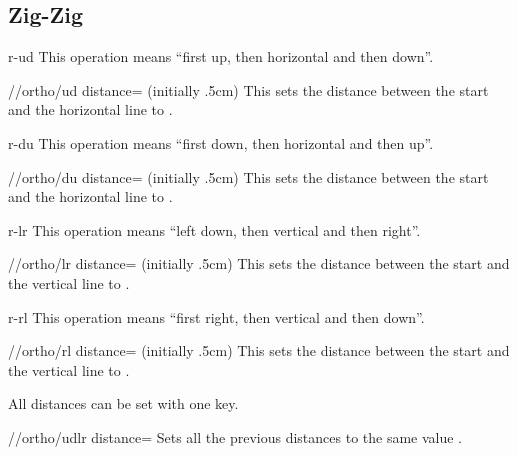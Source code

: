 \subsection{Zig-Zig}
\begin{pathoperation}{r-ud}{}
  This operation means ``first up, then horizontal and then down''.
  \begin{key}{/\tikzext/ortho/ud distance= (initially .5cm)}
    This sets the distance between the start and the horizontal line to .
  \end{key}
\end{pathoperation}
\begin{pathoperation}{r-du}{}
  This operation means ``first down, then horizontal and then up''.
  \begin{key}{/\tikzext/ortho/du distance= (initially .5cm)}
    This sets the distance between the start and the horizontal line to .
  \end{key}
\end{pathoperation}
\begin{pathoperation}{r-lr}{}
  This operation means ``left down, then vertical and then right''.
  \begin{key}{/\tikzext/ortho/lr distance= (initially .5cm)}
    This sets the distance between the start and the vertical line to .
  \end{key}
\end{pathoperation}
\begin{pathoperation}{r-rl}{}
  This operation means ``first right, then vertical and then down''.
  \begin{key}{/\tikzext/ortho/rl distance= (initially .5cm)}
    This sets the distance between the start and the vertical line to .
  \end{key}
\end{pathoperation}

All distances can be set with one key.
\begin{key}{/\tikzext/ortho/udlr distance=}
  Sets all the previous distances to the same value .
\end{key}

